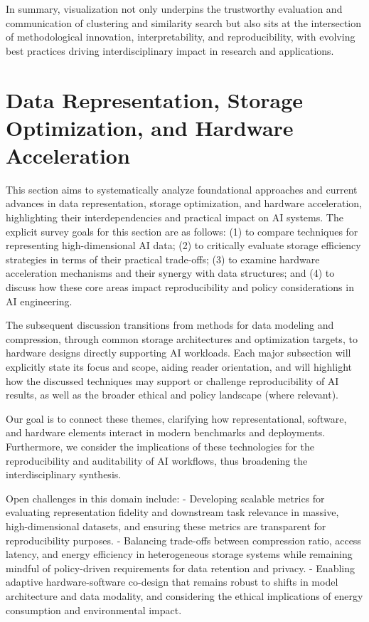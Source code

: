 \documentclass[sigconf]{acmart}
\begin{document}
In summary, visualization not only underpins the trustworthy evaluation and communication of clustering and similarity search but also sits at the intersection of methodological innovation, interpretability, and reproducibility, with evolving best practices driving interdisciplinary impact in research and applications.

\section{Data Representation, Storage Optimization, and Hardware Acceleration}
\label{sec:data-representation-optimization}

This section aims to systematically analyze foundational approaches and current advances in data representation, storage optimization, and hardware acceleration, highlighting their interdependencies and practical impact on AI systems. The explicit survey goals for this section are as follows: (1) to compare techniques for representing high-dimensional AI data; (2) to critically evaluate storage efficiency strategies in terms of their practical trade-offs; (3) to examine hardware acceleration mechanisms and their synergy with data structures; and (4) to discuss how these core areas impact reproducibility and policy considerations in AI engineering.

The subsequent discussion transitions from methods for data modeling and compression, through common storage architectures and optimization targets, to hardware designs directly supporting AI workloads. Each major subsection will explicitly state its focus and scope, aiding reader orientation, and will highlight how the discussed techniques may support or challenge reproducibility of AI results, as well as the broader ethical and policy landscape (where relevant).

Our goal is to connect these themes, clarifying how representational, software, and hardware elements interact in modern benchmarks and deployments. Furthermore, we consider the implications of these technologies for the reproducibility and auditability of AI workflows, thus broadening the interdisciplinary synthesis.

Open challenges in this domain include:
- Developing scalable metrics for evaluating representation fidelity and downstream task relevance in massive, high-dimensional datasets, and ensuring these metrics are transparent for reproducibility purposes.
- Balancing trade-offs between compression ratio, access latency, and energy efficiency in heterogeneous storage systems while remaining mindful of policy-driven requirements for data retention and privacy.
- Enabling adaptive hardware-software co-design that remains robust to shifts in model architecture and data modality, and considering the ethical implications of energy consumption and environmental impact.
\end{document}
